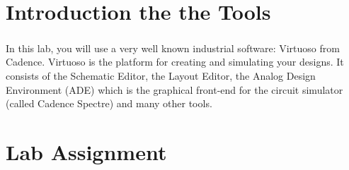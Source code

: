 \section{Introduction the the Tools}
In this lab, you will use a very well known industrial software: Virtuoso\textsuperscript{\tiny\textregistered} from Cadence. Virtuoso is the platform for creating and simulating your designs. It consists of the Schematic Editor, the Layout Editor, the Analog Design Environment (ADE) which is the graphical front-end for the circuit simulator (called Cadence Spectre) and many other tools.

\section{Lab Assignment}



